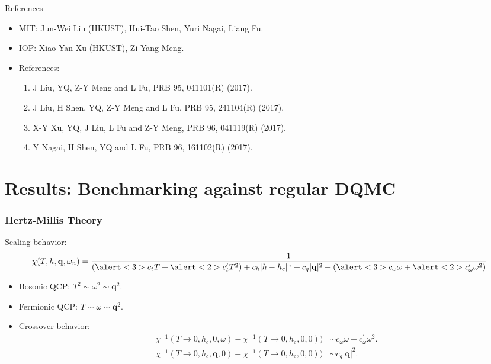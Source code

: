 \documentclass[xcolor=table, 10pt, aspectratio=43]{beamer}
\begin{document}
\begin{frame}{References}
\begin{itemize}
\item MIT: Jun-Wei Liu (HKUST), Hui-Tao Shen, Yuri Nagai, Liang Fu.
\item IOP: Xiao-Yan Xu (HKUST), Zi-Yang Meng.
\item References:
\begin{enumerate}
  \item J Liu, YQ, Z-Y Meng and L Fu, PRB 95, 041101(R) (2017).
  \item J Liu, H Shen, YQ, Z-Y Meng and L Fu, PRB 95, 241104(R) (2017).
  \item \alert{X-Y Xu, YQ, J Liu, L Fu and Z-Y Meng, PRB 96, 041119(R) (2017).}
  \item Y Nagai, H Shen, YQ and L Fu, PRB 96, 161102(R) (2017).
\end{enumerate}
\end{itemize}
\end{frame}


\section{Results: Benchmarking against regular DQMC}

\begin{frame}
  \frametitle{Hertz-Millis Theory}
  Scaling behavior:
\[\chi(T,h,\mathbf{q},\omega_n)=
\frac{1}{(\alert<3>{c_{t}T}+\alert<2>{c_{t}' T^{2}})
+c_{h}|h-h_c|^{\gamma}+c_q|\mathbf{q}|^2
+ (\alert<3>{c_{\omega}\omega}+\alert<2>{c'_{\omega}\omega^{2}})}\]
\begin{itemize}
  \item<2-> Bosonic QCP: $T^2\sim\omega^2\sim \bm q^2$.
  \item<3-> Fermionic QCP: $T\sim\omega\sim \bm q^2$.
  \item<4-> Crossover behavior:
  \begin{align*}
    \chi^{-1}(T\rightarrow0,h_c,0,\omega)-\chi^{-1}(T\rightarrow0,h_c,0,0))
    &\sim c_\omega\omega + c_\omega^\prime\omega^2.\\
    \chi^{-1}(T\rightarrow0,h_c,\bm q,0)-\chi^{-1}(T\rightarrow0,h_c,0,0))
    &\sim c_q|\bm q|^2.
  \end{align*}
\end{itemize}
\end{frame}
\end{document}
